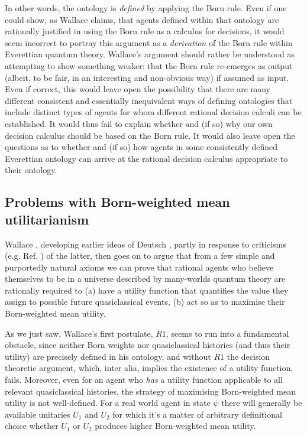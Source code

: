 \documentclass[aps,
pra,epsfig,12pt,nofootinbib]{revtex4}
\begin{document}
In other words, the ontology is {\it defined} by applying the Born rule.   
Even if one could show, as Wallace claims, that agents defined within that 
ontology are rationally justified in using the Born rule as a 
calculus for decisions, it would seem incorrect to portray this
argument as a {\it derivation} of the Born rule within Everettian
quantum theory.   Wallace's argument should rather be understood
as attempting to show something weaker: that the Born rule re-emerges as output
(albeit, to be fair, in an interesting and non-obvious way) 
if assumed as input.  
Even if correct, this would leave 
open the possibility that there are many different 
consistent and essentially inequivalent ways of defining ontologies 
that include distinct types of agents for whom different rational 
decision calculi can be established.
It would thus fail to explain whether and (if so) why our own decision calculus
should be based on the Born rule.  It
would also leave open the questions as to whether and (if so) how   
agents in some consistently defined Everettian ontology can arrive 
at the rational decision calculus appropriate to their ontology. 

\subsection{Problems with Born-weighted mean utilitarianism} 

Wallace \cite{wallacevoltwo}, developing earlier 
ideas of Deutsch \cite{deutschtwo}, partly 
in response to criticisms (e.g. Ref. \cite{barnumetal}) of 
the latter, 
then goes on to argue that from a few simple and purportedly 
natural axioms we can prove that  
rational agents who believe 
themselves to be in a universe described by many-worlds quantum theory
are rationally required to (a) have a utility function that quantifies 
the value they assign to possible future quasiclassical events,
(b) act so as to maximise their Born-weighted mean utility.

As we just saw, Wallace's first postulate, $R1$, seems to run
into a fundamental obstacle, since neither Born weights nor 
quasiclassical histories (and thus their utility) are precisely
defined in his ontology, and without $R1$ the decision theoretic 
argument, which, inter alia, implies the existence of a utility function, 
fails.   Moreover, even for an agent who {\it has}
a utility function applicable to all relevant quasiclassical
histories, the strategy of maximising Born-weighted mean utility
is not well-defined.  For a real world agent in state $\psi$
there will generally be available unitaries $U_1$ and $U_2$ for 
which it's a matter of arbitrary definitional choice 
whether $U_1$ or $U_2$ produces higher Born-weighted mean utility. 
\end{document}
